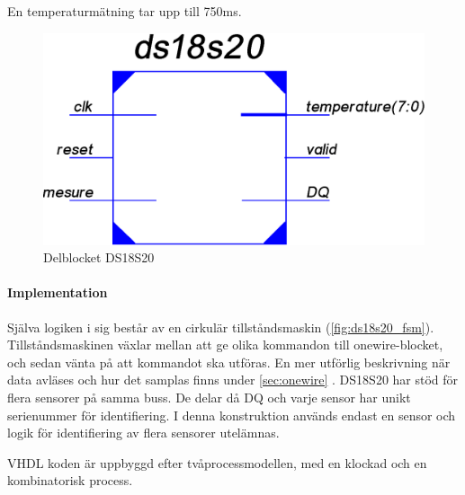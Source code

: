 \documentclass[a4paper]{scrreprt}
\begin{document}
En temperaturmätning tar upp till 750ms.
\begin{figure}[htp]
\centering
\includegraphics[scale=0.5]{ds18s20_sch.eps}
\caption{Delblocket DS18S20}
\end{figure}

\paragraph{Implementation}
Själva logiken i sig består av en cirkulär tillståndsmaskin (\autoref{fig:ds18s20_fsm}).
Tillståndsmaskinen växlar mellan att ge olika kommandon till onewire-blocket, och sedan vänta på att kommandot ska utföras. En mer utförlig beskrivning när data avläses och hur det samplas finns under \ref{sec:onewire} .
DS18S20 har stöd för flera sensorer på samma buss. De delar då DQ och varje sensor har unikt serienummer för identifiering. I denna konstruktion används endast en sensor och logik för identifiering av flera sensorer utelämnas.

VHDL koden är uppbyggd efter tvåprocessmodellen, med en klockad och en kombinatorisk process.
\end{document}
